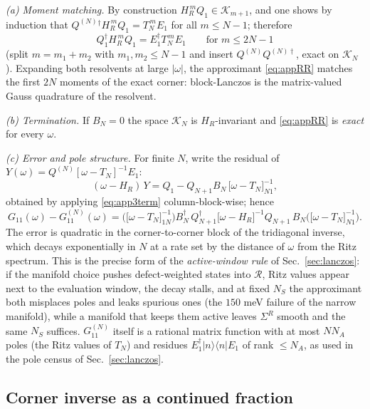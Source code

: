 \documentclass[aps,prx,reprint,superscriptaddress,nofootinbib,longbibliography]{revtex4-2}
\newcommand{\HR}{H_R}
\begin{document}
\emph{(a) Moment matching.} By construction
$\HR^{\,m}Q_1\in\mathcal{K}_{m+1}$, and one shows by induction that
$Q^{(N)}{}^{\dagger}\HR^{\,m}Q_1=T_N^{\,m}E_1$ for all $m\le N-1$; therefore
\begin{equation}
  Q_1^{\dagger}\HR^{\,m}Q_1=E_1^{\dagger}T_N^{\,m}E_1
  \qquad\text{for } m\le 2N-1
  \label{eq:moments}
\end{equation}
(split $m=m_1+m_2$ with $m_1,m_2\le N-1$ and insert
$Q^{(N)}Q^{(N)\dagger}$, exact on $\mathcal{K}_N$). Expanding both
resolvents at large $|\omega|$, the approximant \eqref{eq:appRR} matches the
first $2N$ moments of the exact corner: block-Lanczos is the matrix-valued
Gauss quadrature of the resolvent.

\emph{(b) Termination.} If $B_N=0$ the space $\mathcal{K}_N$ is
$\HR$-invariant and \eqref{eq:appRR} is \emph{exact} for every $\omega$.

\emph{(c) Error and pole structure.} For finite $N$, write the residual of
$Y(\omega)=Q^{(N)}[\omega-T_N]^{-1}E_1$:
\begin{equation}
  (\omega-\HR)\,Y=Q_1-Q_{N+1}B_N\,
  \big[\omega-T_N\big]^{-1}_{N1},
  \label{eq:appres}
\end{equation}
obtained by applying \eqref{eq:app3term} column-block-wise; hence
\begin{equation}
  G_{11}(\omega)-G^{(N)}_{11}(\omega)=
  \Big(\big[\omega-T_N\big]^{-1}_{1N}\Big) B_N^{\dagger}\,
  Q_{N+1}^{\dagger}\big[\omega-\HR\big]^{-1}Q_{N+1}\,
  B_N \Big(\big[\omega-T_N\big]^{-1}_{N1}\Big).
  \label{eq:apperr}
\end{equation}
The error is quadratic in the corner-to-corner block of the tridiagonal
inverse, which decays exponentially in $N$ at a rate set by the distance of
$\omega$ from the Ritz spectrum. This is the precise form of the
\emph{active-window rule} of Sec.~\ref{sec:lanczos}: if the manifold choice
pushes defect-weighted states into $\mathcal{R}$, Ritz values appear next to
the evaluation window, the decay stalls, and at fixed $N_S$ the approximant
both misplaces poles and leaks spurious ones (the $150$ meV failure of the
narrow manifold), while a manifold that keeps them active leaves
$\Sigma^R$ smooth and the same $N_S$ suffices.
$G^{(N)}_{11}$ itself is a rational matrix function with at most $NN_A$
poles (the Ritz values of $T_N$) and residues
$E_1^{\dagger}|n\rangle\langle n|E_1$ of rank $\le N_A$, as used in the
pole census of Sec.~\ref{sec:lanczos}.

\subsection{Corner inverse as a continued fraction}
\end{document}
